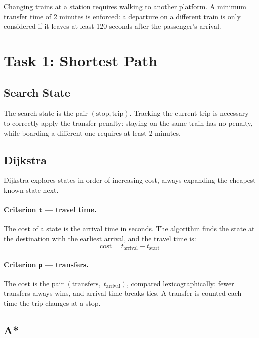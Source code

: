 \documentclass[12pt,a4paper]{article}
\begin{document}
Changing trains at a station requires walking to another platform. A minimum
transfer time of 2 minutes is enforced: a departure on a different train is
only considered if it leaves at least 120 seconds after the passenger's arrival.

\section{Task 1: Shortest Path}

\subsection{Search State}

The search state is the pair $(\text{stop}, \text{trip})$. Tracking the current
trip is necessary to correctly apply the transfer penalty: staying on the same
train has no penalty, while boarding a different one requires at least 2 minutes.

\subsection{Dijkstra}

Dijkstra explores states in order of increasing cost, always expanding the
cheapest known state next.

\paragraph{Criterion \texttt{t} — travel time.}
The cost of a state is the arrival time in seconds. The algorithm finds the
state at the destination with the earliest arrival, and the travel time is:
\[
  \text{cost} = t_{\text{arrival}} - t_{\text{start}}
\]

\paragraph{Criterion \texttt{p} — transfers.}
The cost is the pair $(\text{transfers},\; t_{\text{arrival}})$, compared
lexicographically: fewer transfers always wins, and arrival time breaks ties.
A transfer is counted each time the trip changes at a stop.

\subsection{A*}
\end{document}
